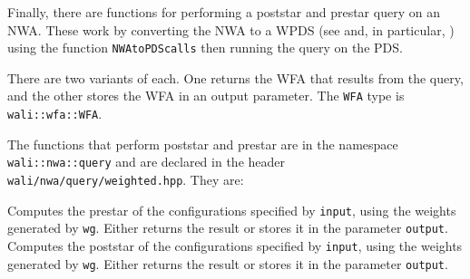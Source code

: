 Finally, there are functions for performing a poststar and prestar
query on an NWA. These work by converting the NWA to a WPDS (see
 and, in particular, ) using
the function \texttt{NWAtoPDScalls} then running the query on the PDS.

There are two variants of each. One returns the WFA that results from
the query, and the other stores the WFA in an output parameter. The
\texttt{WFA} type is \texttt{wali::wfa::WFA}.

The functions that perform poststar and prestar are in the namespace
\texttt{wali::nwa::query} and are declared in the header
\texttt{wali/nwa/query/weighted.hpp}. They are:
\begin{functionlist}
    Computes the prestar of the configurations specified by
    \texttt{input}, using the weights generated by \texttt{wg}. Either
    returns the result or stores it in the parameter \texttt{output}.
    Computes the poststar of the configurations specified by
    \texttt{input}, using the weights generated by \texttt{wg}. Either
    returns the result or stores it in the parameter \texttt{output}.
\end{functionlist}

